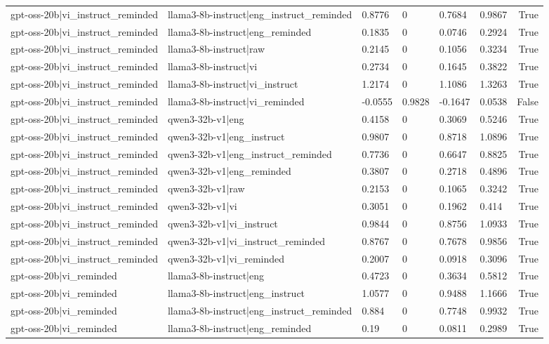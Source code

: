 \begin{table}
\begin{tabular}{llllllr}
gpt-oss-20b|vi_instruct_reminded & llama3-8b-instruct|eng_instruct_reminded & 0.8776 & 0 & 0.7684 & 0.9867 & True \\
gpt-oss-20b|vi_instruct_reminded & llama3-8b-instruct|eng_reminded & 0.1835 & 0 & 0.0746 & 0.2924 & True \\
gpt-oss-20b|vi_instruct_reminded & llama3-8b-instruct|raw & 0.2145 & 0 & 0.1056 & 0.3234 & True \\
gpt-oss-20b|vi_instruct_reminded & llama3-8b-instruct|vi & 0.2734 & 0 & 0.1645 & 0.3822 & True \\
gpt-oss-20b|vi_instruct_reminded & llama3-8b-instruct|vi_instruct & 1.2174 & 0 & 1.1086 & 1.3263 & True \\
gpt-oss-20b|vi_instruct_reminded & llama3-8b-instruct|vi_reminded & -0.0555 & 0.9828 & -0.1647 & 0.0538 & False \\
gpt-oss-20b|vi_instruct_reminded & qwen3-32b-v1|eng & 0.4158 & 0 & 0.3069 & 0.5246 & True \\
gpt-oss-20b|vi_instruct_reminded & qwen3-32b-v1|eng_instruct & 0.9807 & 0 & 0.8718 & 1.0896 & True \\
gpt-oss-20b|vi_instruct_reminded & qwen3-32b-v1|eng_instruct_reminded & 0.7736 & 0 & 0.6647 & 0.8825 & True \\
gpt-oss-20b|vi_instruct_reminded & qwen3-32b-v1|eng_reminded & 0.3807 & 0 & 0.2718 & 0.4896 & True \\
gpt-oss-20b|vi_instruct_reminded & qwen3-32b-v1|raw & 0.2153 & 0 & 0.1065 & 0.3242 & True \\
gpt-oss-20b|vi_instruct_reminded & qwen3-32b-v1|vi & 0.3051 & 0 & 0.1962 & 0.414 & True \\
gpt-oss-20b|vi_instruct_reminded & qwen3-32b-v1|vi_instruct & 0.9844 & 0 & 0.8756 & 1.0933 & True \\
gpt-oss-20b|vi_instruct_reminded & qwen3-32b-v1|vi_instruct_reminded & 0.8767 & 0 & 0.7678 & 0.9856 & True \\
gpt-oss-20b|vi_instruct_reminded & qwen3-32b-v1|vi_reminded & 0.2007 & 0 & 0.0918 & 0.3096 & True \\
gpt-oss-20b|vi_reminded & llama3-8b-instruct|eng & 0.4723 & 0 & 0.3634 & 0.5812 & True \\
gpt-oss-20b|vi_reminded & llama3-8b-instruct|eng_instruct & 1.0577 & 0 & 0.9488 & 1.1666 & True \\
gpt-oss-20b|vi_reminded & llama3-8b-instruct|eng_instruct_reminded & 0.884 & 0 & 0.7748 & 0.9932 & True \\
gpt-oss-20b|vi_reminded & llama3-8b-instruct|eng_reminded & 0.19 & 0 & 0.0811 & 0.2989 & True \\

\end{tabular}
\end{table}

